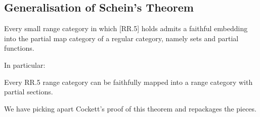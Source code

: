 \subsection{Generalisation of Schein's Theorem}
\begin{theorem} 
Every small range category in
which [RR.5] holds admits a faithful embedding into the partial
map category of a regular category, namely sets and partial functions.
\end{theorem}

In particular:
\begin{corollary}
\label{scheincorollary}
Every RR.5 range category can be faithfully mapped into a range category with partial sections.
\end{corollary}

We have picking apart Cockett's proof of this theorem
and repackages  the pieces.  